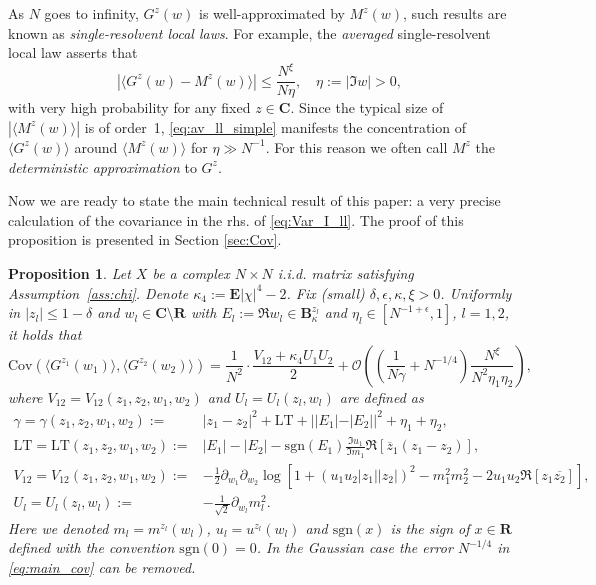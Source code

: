 \documentclass[10pt]{amsart}
\newtheorem{proposition}[theorem]{Proposition}
\numberwithin{equation}{section}
\newcommand{\E}{\mathbf{E}}
\newcommand{\R}{\mathbf{R}}
\newcommand{\C}{\mathbf{C}}
\newcommand{\Cov}{\mathrm{Cov}}
\begin{document}
As $N$ goes to infinity, $G^z(w)$ is well-approximated by $M^z(w)$, such results are known as \emph{single-resolvent local laws}. For example, the \emph{averaged} single-resolvent local law \cite[Theorem~3.1]{macroCLT_real} asserts that
\begin{equation}
\left\vert\langle G^z(w)-M^z(w)\rangle\right\vert\le \frac{N^\xi}{N\eta},\quad \eta:=|\Im w|>0,
\label{eq:av_ll_simple}
\end{equation}
with very high probability for any fixed $z\in\C$. Since the typical size of $|\langle M^z(w)\rangle|$ is of order~1, \eqref{eq:av_ll_simple} manifests the concentration of $\langle G^z(w)\rangle$ around $\langle M^z(w)\rangle$ for $\eta\gg N^{-1}$. For this reason we often call $M^z$ the \emph{deterministic approximation} to $G^z$.

Now we are ready to state the main technical result of this paper: a very precise calculation of the covariance in the rhs. of \eqref{eq:Var_I_ll}. The proof of this proposition is presented in Section \ref{sec:Cov}. 
\begin{proposition}\label{prop:Cov} Let $X$ be a complex $N\times N$ i.i.d. matrix satisfying Assumption~\ref{ass:chi}. Denote $\kappa_4:=\E|\chi|^4-2$. Fix (small) $\delta, \epsilon, \kappa, \xi>0$. Uniformly in $|z_l|\le 1-\delta$ and $w_l\in\C\setminus\R$ with $E_l:=\Re w_l\in \mathbf{B}_\kappa^{z_l}$ and $\eta_l\in [N^{-1+\epsilon}, 1]$, $l=1,2$, it holds that
\begin{equation}
\Cov \left(\langle G^{z_1}(w_1)\rangle,\langle G^{z_2}(w_2)\rangle\right) = \frac{1}{N^2}\cdot \frac{V_{12}+\kappa_4U_1U_2}{2} + \mathcal{O}\left(\left(\frac{1}{N\gamma}+N^{-1/4}\right)\frac{N^\xi}{N^2\eta_1\eta_2}\right),
\label{eq:main_cov}
\end{equation}
where $V_{12}=V_{12}(z_1,z_2,w_1,w_2)$ and $U_l=U_l(z_l,w_l)$ are defined as
\begin{equation}
\begin{split}
\gamma=\gamma(z_1,z_2,w_1,w_2):=&|z_1-z_2|^2 +\mathrm{LT} + ||E_1|-|E_2||^2 +\eta_1+\eta_2,\\
\mathrm{LT}=\mathrm{LT}(z_1,z_2,w_1,w_2):=&|E_1|-|E_2| - \mathrm{sgn}(E_1) \frac{\Im u_1}{\Im m_1} \Re \left[\overline{z}_1(z_1-z_2)\right],\\
V_{12}=V_{12}(z_1,z_2,w_1,w_2):=&-\frac{1}{2}\partial_{w_1}\partial_{w_2}\log \left[ 1+(u_1u_2|z_1||z_2|)^2-m_1^2m_2^2-2u_1u_2\Re [z_1\overline{z_2}]\right],\\
U_l=U_l(z_l,w_l):=&-\frac{1}{\sqrt{2}}\partial_{w_l}m_l^2.
\end{split}
\label{eq:def_UV}
\end{equation}
Here we denoted $m_l=m^{z_l}(w_l)$, $u_l=u^{z_l}(w_l)$ and $\mathrm{sgn}(x)$ is the sign of $x\in \R$ defined with the convention $\mathrm{sgn}(0)=0$. In the Gaussian case the error $N^{-1/4}$ in \eqref{eq:main_cov} can be removed.
\end{proposition}
\end{document}
